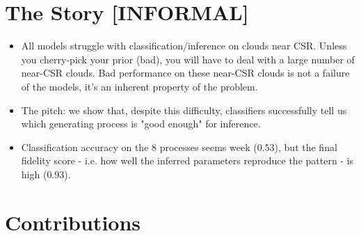 \documentclass[11pt]{article}
\begin{document}
\newpage
\section*{The Story [INFORMAL]}

\begin{itemize}
    \item All models struggle with classification/inference on clouds near CSR. Unless you cherry-pick your prior (bad), you will have to deal with a large number of near-CSR clouds. Bad performance on these near-CSR clouds is not a failure of the models, it's an inherent property of the problem. 

    \item The pitch: we show that, despite this difficulty, classifiers successfully tell us which generating process is "good enough" for inference.

    \item Classification accuracy on the 8 processes seems week ($0.53$), but the final fidelity score - i.e. how well the inferred parameters reproduce the pattern - is high ($0.93$).
\end{itemize}

\section*{Contributions}
\end{document}
